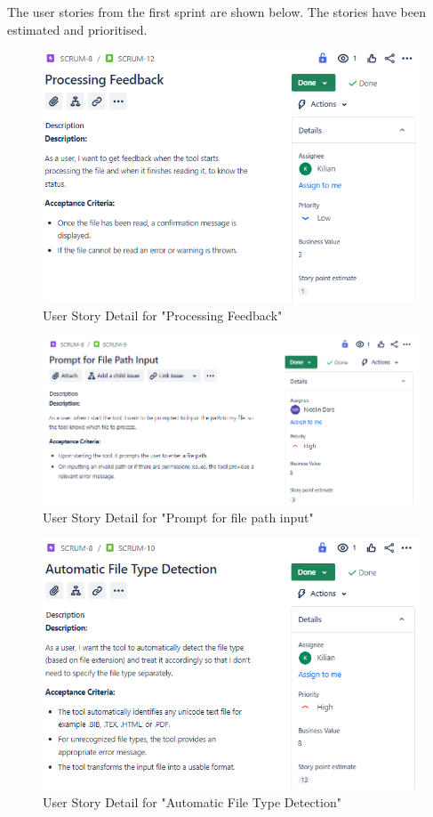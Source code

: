 The user stories from the first sprint are shown below. The stories have been estimated and prioritised.

\begin{figure}[h!]
    \centering
    \includegraphics[width=1\textwidth]{pictures/Scrum/Sprint 1/UserStory_4}
    \caption{User Story Detail for "Processing Feedback"}
    \label{fig:sprint_1_userstory_1}
\end{figure}
\begin{figure}[h!]
    \centering
    \includegraphics[width=1\textwidth]{pictures/Scrum/Sprint 1/UserStory_1}
    \caption{User Story Detail for "Prompt for file path input"}
    \label{fig:sprint_1_userstory_2}
\end{figure}
\begin{figure}[h!]
    \centering
    \includegraphics[width=1\textwidth]{pictures/Scrum/Sprint 1/UserStory_2}
    \caption{User Story Detail for "Automatic File Type Detection"}
    \label{fig:sprint_1_userstory_3}
\end{figure}
